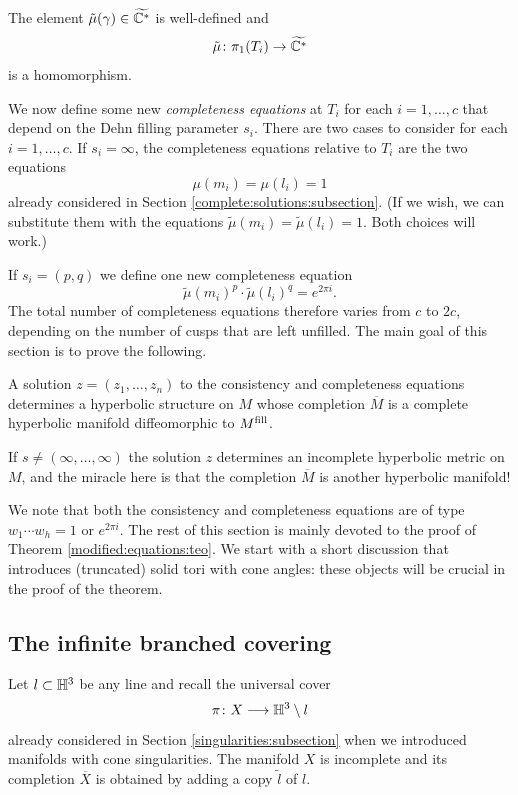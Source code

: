 \begin{ex} The element $\tilde\mu(\gamma)\in\widetilde{\mathbb{C}^*}$ is well-defined and
$$\tilde\mu\colon \pi_1(T_i) \to \widetilde{\mathbb{C}^*}$$
is a homomorphism.
\end{ex}

We now define some new \emph{completeness equations} at $T_i$ for each $i=1,\ldots, c$ that depend on the Dehn filling parameter $s_i$. There are two cases to consider for each $i=1,\ldots, c$. If $s_i = \infty$, the completeness equations relative to $T_i$ are the two equations 
$$\mu(m_i) = \mu(l_i) = 1$$ 
already considered in Section \ref{complete:solutions:subsection}. (If we wish, we can substitute them with the equations $\tilde\mu(m_i) = \tilde\mu(l_i) = 1$.
Both choices will work.) 

If $s_i = (p,q)$ we define one new completeness equation
$$\tilde\mu(m_i)^p \cdot \tilde\mu(l_i)^q = e^{2\pi i}.$$
The total number of completeness equations therefore varies from $c$ to $2c$, depending on the number of cusps that are left unfilled. The main goal of this section is to prove the following.

\begin{teo} \label{modified:equations:teo}
A solution $z = (z_1,\ldots, z_n)$ to the consistency and completeness equations determines a hyperbolic structure on $M$ whose completion $\overline M$ is a complete hyperbolic manifold diffeomorphic to $M^{\rm fill}$.
\end{teo}

If $s\neq (\infty, \ldots, \infty)$ the solution $z$ determines an incomplete hyperbolic metric on $M$, and the miracle here is that the completion $\overline M$ is another hyperbolic manifold! 

We note that both the consistency and completeness equations are of type $w_1\cdots w_h = 1$ or $e^{2\pi i}$.
The rest of this section is mainly devoted to the proof of Theorem \ref{modified:equations:teo}. We start with a short discussion that introduces (truncated) solid tori with cone angles: these objects will be crucial in the proof of the theorem.

\subsection{The infinite branched covering}
Let $l\subset \mathbb{H}^3$ be any line and recall the universal cover
$$\pi \colon X \longrightarrow \mathbb{H}^3 \setminus l$$ 
already considered in Section \ref{singularities:subsection} when we introduced manifolds with cone singularities. The manifold $X$ is incomplete and its completion $\overline X$ is obtained by adding a copy $\tilde l$ of $l$.

